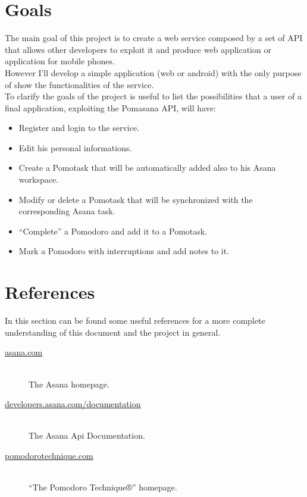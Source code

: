 	\section{Goals}
	\label{goals}
	The main goal of this project is to create a web service composed by a set of API that allows other developers to exploit it and produce web application or application for mobile phones.\\
	However I'll develop a simple application (web or android) with the only purpose of show the functionalities of the service.\\
	To clarify the goals of the project is useful to list the possibilities that a user of a final application, exploiting the Pomasana API, will have:

	\begin{itemize}

		\item Register and login to the service.

		\item Edit his personal informations.

		\item Create a Pomotask that will be automatically added also to his Asana workspace.

		\item Modify or delete a Pomotask that will be synchronized with the corresponding Asana task.

		\item ``Complete'' a Pomodoro and add it to a Pomotask.

		\item Mark a Pomodoro with interruptions and add notes to it.


	\end{itemize}



	\section{References}
	\label{references}
		In this section can be found some useful references for a more complete understanding of this document and the project in general.

		\begin{description}

		\item[\href{https://asana.com}{asana.com}] \hfill \\
		The Asana homepage.

		\item[\href{http://developers.asana.com/documentation/}{developers.asana.com/documentation}] \hfill \\
		The Asana Api Documentation.

		\item[\href{http://pomodorotechnique.com}{pomodorotechnique.com}] \hfill \\
		“The Pomodoro Technique®” homepage.

		\end{description}

